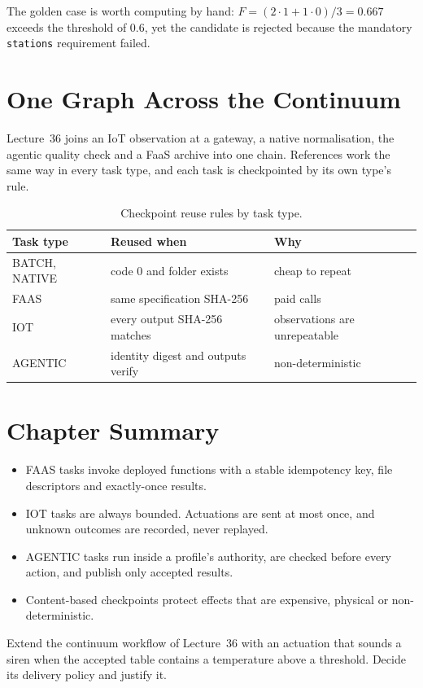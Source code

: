 

The golden case is worth computing by hand: $F = (2\cdot1 + 1\cdot0)/3 =
0.667$ exceeds the threshold of 0.6, yet the candidate is rejected because the
mandatory \texttt{stations} requirement failed.

\section{One Graph Across the Continuum}

Lecture~36 joins an IoT observation at a gateway, a native normalisation, the
agentic quality check and a FaaS archive into one chain. References work the
same way in every task type, and each task is checkpointed by its own type's
rule.





\begin{table}[h]
\centering
\begin{tabular}{@{}lll@{}}
\toprule
Task type & Reused when & Why \\
\midrule
BATCH, NATIVE & code 0 and folder exists & cheap to repeat \\
FAAS & same specification SHA-256 & paid calls \\
IOT & every output SHA-256 matches & observations are unrepeatable \\
AGENTIC & identity digest and outputs verify & non-deterministic \\
\bottomrule
\end{tabular}
\caption{Checkpoint reuse rules by task type.}
\label{tab:reuse-rules}
\end{table}

\section{Chapter Summary}

\begin{itemize}[leftmargin=1.4em]
  \item FAAS tasks invoke deployed functions with a stable idempotency key, file descriptors and exactly-once results.
  \item IOT tasks are always bounded. Actuations are sent at most once, and
    unknown outcomes are recorded, never replayed.
  \item AGENTIC tasks run inside a profile's authority, are checked before
    every action, and publish only accepted results.
  \item Content-based checkpoints protect effects that are expensive,
    physical or non-deterministic.
\end{itemize}

\begin{exercise}
Extend the continuum workflow of Lecture~36 with an actuation that sounds a
siren when the accepted table contains a temperature above a threshold. Decide
its delivery policy and justify it.
\end{exercise}
